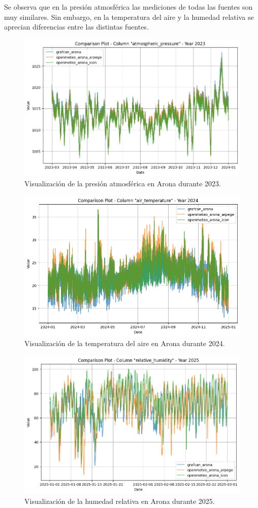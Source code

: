 Se observa que en la presión atmosférica las mediciones de todas las fuentes son muy similares. Sin embargo, 
en la temperatura del aire y la humedad relativa se aprecian diferencias entre las distintas fuentes.
\begin{figure}
    \centering
    \includegraphics[width=.8\linewidth]{images/visualizacion_1.png}
    \caption{Visualización de la presión atmosférica en Arona durante 2023.}
    \label{visualizacion_1}
\end{figure}
\begin{figure}
    \centering
    \includegraphics[width=.8\linewidth]{images/visualizacion_2.png}
    \caption{Visualización de la temperatura del aire en Arona durante 2024.}
    \label{visualizacion_2}
\end{figure}
\begin{figure}
    \centering
    \includegraphics[width=.8\linewidth]{images/visualizacion_3.png}
    \caption{Visualización de la humedad relativa en Arona durante 2025.}
    \label{visualizacion_3}
\end{figure}


